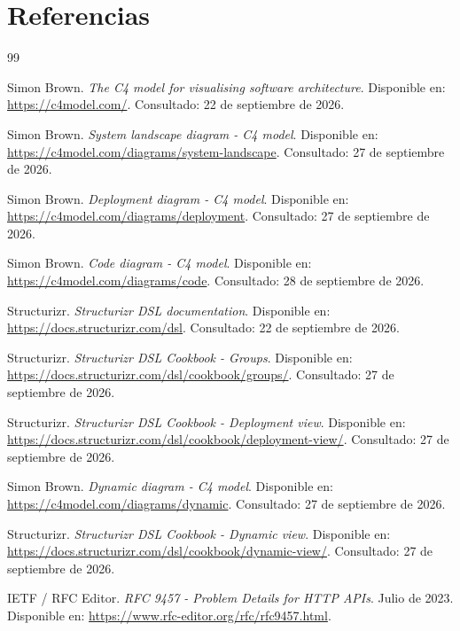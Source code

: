 \documentclass[12pt,a4paper]{article}
\begin{document}
\section{Referencias}

\begin{thebibliography}{99}

Simon Brown. \textit{The C4 model for visualising software architecture}. Disponible en: \url{https://c4model.com/}. Consultado: 22 de septiembre de 2026.

Simon Brown. \textit{System landscape diagram - C4 model}. Disponible en: \url{https://c4model.com/diagrams/system-landscape}. Consultado: 27 de septiembre de 2026.


Simon Brown. \textit{Deployment diagram - C4 model}. Disponible en: \url{https://c4model.com/diagrams/deployment}. Consultado: 27 de septiembre de 2026.

Simon Brown. \textit{Code diagram - C4 model}. Disponible en: \url{https://c4model.com/diagrams/code}. Consultado: 28 de septiembre de 2026.


Structurizr. \textit{Structurizr DSL documentation}. Disponible en: \url{https://docs.structurizr.com/dsl}. Consultado: 22 de septiembre de 2026.

Structurizr. \textit{Structurizr DSL Cookbook - Groups}. Disponible en: \url{https://docs.structurizr.com/dsl/cookbook/groups/}. Consultado: 27 de septiembre de 2026.


Structurizr. \textit{Structurizr DSL Cookbook - Deployment view}. Disponible en: \url{https://docs.structurizr.com/dsl/cookbook/deployment-view/}. Consultado: 27 de septiembre de 2026.



Simon Brown. \textit{Dynamic diagram - C4 model}. Disponible en: \url{https://c4model.com/diagrams/dynamic}. Consultado: 27 de septiembre de 2026.

Structurizr. \textit{Structurizr DSL Cookbook - Dynamic view}. Disponible en: \url{https://docs.structurizr.com/dsl/cookbook/dynamic-view/}. Consultado: 27 de septiembre de 2026.

IETF / RFC Editor. \textit{RFC 9457 - Problem Details for HTTP APIs}. Julio de 2023. Disponible en: \url{https://www.rfc-editor.org/rfc/rfc9457.html}.


\end{thebibliography}
\end{document}
